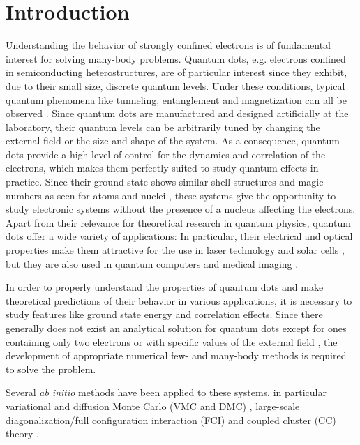 \maketitle

\section{Introduction}

Understanding the behavior of strongly confined electrons is of fundamental
interest for solving many-body problems.  Quantum dots, e.g. electrons
confined in semiconducting heterostructures, are of particular interest since
they exhibit, due to their small size, discrete quantum levels.  Under these
conditions, typical quantum phenomena like tunneling, entanglement and
magnetization can all be observed \cite{reimann2002,engel1993}.  Since quantum
dots are manufactured and designed artificially at the laboratory, their
quantum levels can be arbitrarily tuned by changing the external field or the
size and shape of the system.  As a consequence, quantum dots provide a high
level of control for the dynamics and correlation of the electrons, which
makes them perfectly suited to study quantum effects in practice.  Since their
ground state shows similar shell structures and magic numbers as seen for
atoms and nuclei \cite{tarucha1996}, these systems give the opportunity to
study electronic systems without the presence of a nucleus affecting the
electrons.  Apart from their relevance for theoretical research in quantum
physics, quantum dots offer a wide variety of applications: In particular,
their electrical and optical properties make them attractive for the use in
laser technology \cite{strauf2010,5075760} and solar cells
\cite{jenks:013111,doi:10.1021/cr900289f}, but they are also used in quantum
computers\cite{PhysRevA.57.120} and medical imaging \cite{Ben-Ari02042003}.

In order to properly understand the properties of quantum dots and make
theoretical predictions of their behavior in various applications, it is
necessary to study features like ground state energy and correlation
effects. Since there generally does not exist an analytical solution for
quantum dots except for ones containing only two electrons or with specific
values of the external field \cite{PhysRevA.48.3561}, the development of
appropriate numerical few- and many-body methods is required to solve the
problem.

Several \textit{ab initio} methods have been applied to these systems, in
particular variational and diffusion Monte Carlo (VMC and DMC)
\cite{PhysRevB.68.035304,%
  PhysRevB.62.8120,PhysRevB.84.115302,PhysRevB.54.4780}, large-scale
diagonalization/full configuration interaction (FCI)
\cite{JJAP.36.3924,PhysRevB.56.6428,2008arXiv0810.2644K,rontani:124102} and coupled
cluster (CC) theory \cite{PhysRevB.67.045320,heidari:114708,%
  PhysRevB.84.115302}.

